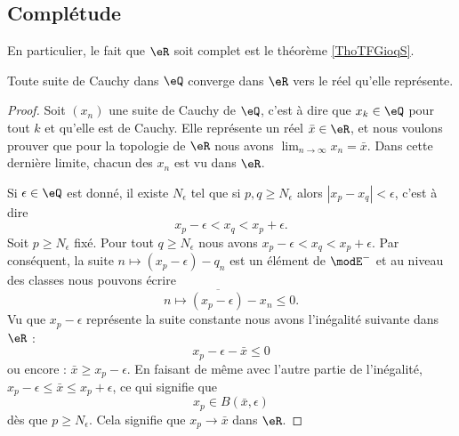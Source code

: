 \subsection{Complétude}

En particulier, le fait que \( \eR\) soit complet est le théorème \ref{ThoTFGioqS}.

\begin{lemma}      \label{LemooRTGFooYVstwS}
    Toute suite de Cauchy dans \( \eQ\) converge dans \( \eR\) vers le réel qu'elle représente.
\end{lemma}

\begin{proof}
    Soit \( (x_n)\) une suite de Cauchy de \( \eQ\), c'est à dire que \( x_k\in \eQ\) pour tout \( k\) et qu'elle est de Cauchy. Elle représente un réel \( \bar x\in \eR\), et nous voulons prouver que pour la topologie de \( \eR\) nous avons \( \lim_{n\to \infty} x_n=\bar x\). Dans cette dernière limite, chacun des \( x_n\) est vu dans \( \eR\).


    Si \( \epsilon\in \eQ\) est donné, il existe \( N_{\epsilon}\) tel que si \( p,q\geq N_{\epsilon}\) alors \( | x_p-x_q |< \epsilon\), c'est à dire
    \begin{equation}
        x_p-\epsilon<x_q<x_p+\epsilon.
    \end{equation}
    Soit \( p\geq N_{\epsilon}\) fixé. Pour tout \( q\geq N_{\epsilon}\) nous avons \(  x_p-\epsilon<x_q<x_p+\epsilon \). Par conséquent, la suite \( n\mapsto (x_p-\epsilon)-q_n\) est un élément de \( \modE^-\) et au niveau des classes nous pouvons écrire
    \begin{equation}
        \overline{ n\mapsto (x_p-\epsilon)-x_n }\leq 0.
    \end{equation}
    Vu que \( x_p-\epsilon\) représente la suite constante nous avons l'inégalité suivante dans \( \eR\) :
    \begin{equation}
        x_p-\epsilon-\bar x\leq 0
    \end{equation}
    ou encore : \( \bar x\geq x_p-\epsilon\). En faisant de même avec l'autre partie de l'inégalité, \( x_p-\epsilon\leq \bar x\leq x_p+\epsilon\), ce qui signifie que
    \begin{equation}
        x_p\in B(\bar x,\epsilon)
    \end{equation}
    dès que \( p\geq N_{\epsilon}\). Cela signifie que \( x_p\to \bar x\) dans \( \eR\).
\end{proof}

